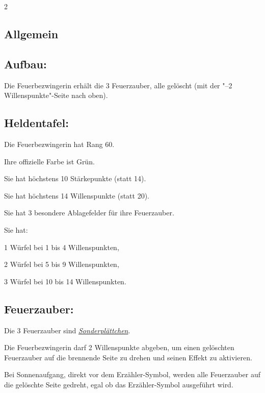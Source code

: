 \documentclass[10pt, a4paper, oneside]{book}
\newcommand{\fan}[1]{\textit{#1}}
\begin{document}
\begin{multicols*}{2}\raggedcolumns


\begin{nobgcolor}

\section{Allgemein}


\subsection{Aufbau:}

Die Feuerbezwingerin erhält die 3 Feuerzauber, alle gelöscht (mit der "–2 Willenspunkte"-Seite nach oben).


\subsection{Heldentafel:}

Die Feuerbezwingerin hat Rang 60.

Ihre offizielle Farbe ist Grün.

Sie hat höchstens 10 Stärkepunkte (statt 14).

Sie hat höchstens 14 Willenspunkte (statt 20).

Sie hat 3 besondere Ablagefelder für ihre Feuerzauber.

Sie hat:

\bullet{} 1 Würfel bei 1 bis 4 Willenspunkten,

\bullet{} 2 Würfel bei 5 bis 9 Willenspunkten,

\bullet{} 3 Würfel bei 10 bis 14 Willenspunkten.





\subsection{Feuerzauber:}

Die 3 Feuerzauber sind \hyperref[Gegenstände und Sonderplättchen]{\fan{Sonderplättchen}}.

Die Feuerbezwingerin darf 2 Willenspunkte abgeben, um einen gelöschten Feuerzauber auf die brennende Seite zu drehen und seinen Effekt zu aktivieren.

Bei Sonnenaufgang, direkt vor dem Erzähler-Symbol, werden alle Feuerzauber auf die gelöschte Seite gedreht, egal ob das Erzähler-Symbol ausgeführt wird.



\end{nobgcolor}
\end{multicols*}
\end{document}

